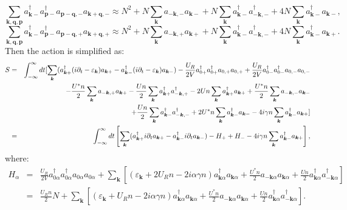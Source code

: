 \documentclass[aps,superscriptaddress,notitlepage,longbibliography]{revtex4-1}
\begin{document}
\begin{equation}
\sum_{\bm{k},\bm{q},\bm{p}}a_{\bm{k}-}^{\dagger}a_{\bm{p}-}^{\dagger}a_{\bm{p}-\bm{q},-}a_{\bm{k}+\bm{q},-}\approx N^{2}+N\sum_{\bm{k}}a_{-\bm{k},-}a_{\bm{k}-}+N\sum_{\bm{k}}a_{\bm{k}-}^{\dagger}a_{-\bm{k},-}^{\dagger}+4N\sum_{\bm{k}}a_{\bm{k}-}^{\dagger}a_{\bm{k}-},
\end{equation}
\begin{equation}
\sum_{\bm{k},\bm{q},\bm{p}}a_{\bm{k}-}^{\dagger}a_{\bm{p}-}^{\dagger}a_{\bm{p}-\bm{q},+}a_{\bm{k}+\bm{q},+}\approx N^{2}+N\sum_{\bm{k}}a_{-\bm{k},+}a_{\bm{k}+}+N\sum_{\bm{k}}a_{\bm{k}-}^{\dagger}a_{-\bm{k},-}^{\dagger}+4N\sum_{\bm{k}}a_{\bm{k}-}^{\dagger}a_{\bm{k}+}.\label{mean3}
\end{equation}
Then the action is simplified as: 
\begin{eqnarray}
S & = & \int_{-\infty}^{\infty}dt[\sum_{\bm{k}}(a_{\bm{k}+}^{\dagger}(i\partial_{t}-\varepsilon_{\bm{k}})a_{\bm{k}+}-a_{\bm{k}-}^{\dagger}(i\partial_{t}-\varepsilon_{\bm{k}})a_{\bm{k}-})-\frac{U_{R}}{2V}a_{0+}^{\dagger}a_{0+}^{\dagger}a_{0,+}a_{0,+}+\frac{U_{R}}{2V}a_{0-}^{\dagger}a_{0-}^{\dagger}a_{0,-}a_{0,-}\nonumber \\
 &  & -\frac{U^{\ast}n}{2}\sum_{\bm{k}}a_{-\bm{k},+}a_{\bm{k}+}-\frac{Un}{2}\sum_{\bm{k}}a_{\bm{k}+}^{\dagger}a_{-\bm{k},+}^{\dagger}-2Un\sum_{\bm{k}}a_{\bm{k}+}^{\dagger}a_{\bm{k}+}+\frac{U^{\ast}n}{2}\sum_{\bm{k}}a_{-\bm{k},-}a_{\bm{k}-}\nonumber \\
 &  & +\frac{Un}{2}\sum_{\bm{k}}a_{\bm{k}-}^{\dagger}a_{-\bm{k},-}^{\dagger}+2U^{\ast}n\sum_{\bm{k}}a_{\bm{k}-}^{\dagger}a_{\bm{k}-}-4i\gamma n\sum_{\bm{k}}a_{\bm{k}-}^{\dagger}a_{\bm{k}+}\large{\large{}]}\\
 & = & \int_{-\infty}^{\infty}dt\left[\sum_{\bm{k}}(a_{\bm{k}+}^{\dagger}i\partial_{t}a_{\bm{k}+}-a_{\bm{k}-}^{\dagger}i\partial_{t}a_{\bm{k}-})-H_{+}+H_{-}-4i\gamma n\sum_{\bm{k}}a_{\bm{k}-}^{\dagger}a_{\bm{k}+}\right],\label{action}
\end{eqnarray}
where: 
\begin{eqnarray}
H_{\alpha} & = & \frac{U_{R}}{2V}a_{0\alpha}^{\dagger}a_{0\alpha}^{\dagger}a_{0\alpha}a_{0\alpha}+\sum_{\bm{k}}\left[(\varepsilon_{\bm{k}}+2U_{R}n-2i\alpha\gamma n)a_{\bm{k}\alpha}^{\dagger}a_{\bm{k}\alpha}+\frac{U^{\ast}n}{2}a_{-\bm{k}\alpha}a_{\bm{k}\alpha}+\frac{Un}{2}a_{\bm{k}\alpha}^{\dagger}a_{-\bm{k}\alpha}^{\dagger}\right]\nonumber \\
 & = & \frac{U_{R}n}{2}N+\sum_{\bm{k}}\left[(\varepsilon_{\bm{k}}+U_{R}n-2i\alpha\gamma n)a_{\bm{k}\alpha}^{\dagger}a_{\bm{k}\alpha}+\frac{U^{\ast}n}{2}a_{-\bm{k}\alpha}a_{\bm{k}\alpha}+\frac{Un}{2}a_{\bm{k}\alpha}^{\dagger}a_{-\bm{k}\alpha}^{\dagger}\right].\label{H}
\end{eqnarray}
\end{document}
